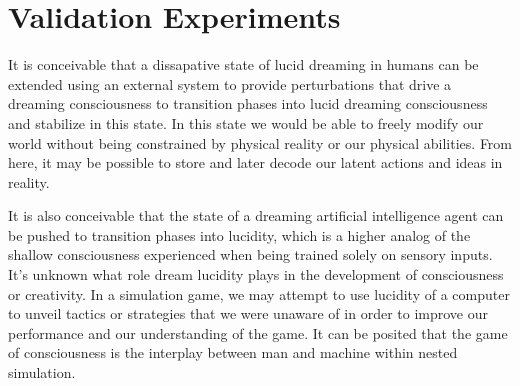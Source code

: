 \documentclass{article}
\begin{document}





\section{Validation Experiments}

It is conceivable that a dissapative state of lucid dreaming in humans can be extended using an external system to provide perturbations that drive a dreaming consciousness to transition phases into lucid dreaming consciousness and stabilize in this state. In this state we would be able to freely modify our world without being constrained by physical reality or our physical abilities. From here, it may be possible to store and later decode our latent actions and ideas in reality. 

It is also conceivable that the state of a dreaming artificial intelligence agent can be pushed to transition phases into lucidity, which is a higher analog of the shallow consciousness experienced when being trained solely on sensory inputs. It's unknown what role dream lucidity plays in the development of consciousness or creativity. In a simulation game, we may attempt to use lucidity of a computer to unveil tactics or strategies that we were unaware of in order to improve our performance and our understanding of the game. It can be posited that the game of consciousness is the interplay between man and machine within nested simulation.


\end{document}
